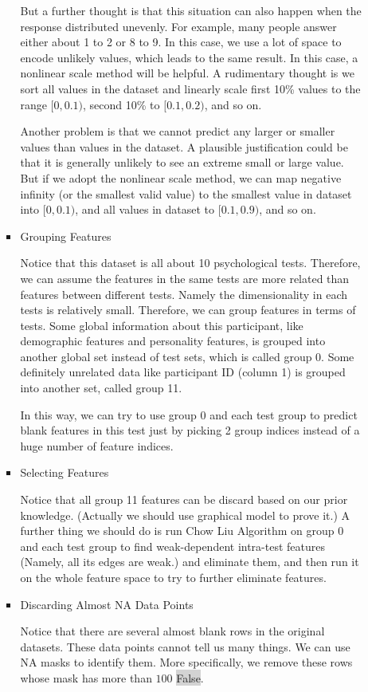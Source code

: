 \documentclass[11pt, a4paper]{article}
\begin{document}
\begin{enumerate}
\begin{itemize}
\begin{itemize}
			\par{But a further thought is that this situation can also happen when the response distributed unevenly. For example, many people answer either about 1 to 2 or 8 to 9. In this case, we use a lot of space to encode unlikely values, which leads to the same result. In this case, a nonlinear scale method will be helpful. A rudimentary thought is we sort all values in the dataset and linearly scale first 10\% values to the range $[0, 0.1)$, second 10\% to $[0.1, 0.2)$, and so on.}
			\par{Another problem is that we cannot predict any larger or smaller values than values in the dataset. A plausible justification could be that it is generally unlikely to see an extreme small or large value. But if we adopt the nonlinear scale method, we can map negative infinity (or the smallest valid value) to the smallest value in dataset into $[0, 0.1)$, and all values in dataset to $[0.1, 0.9)$, and so on.}
			\item {Grouping Features}
			\par{Notice that this dataset is all about 10 psychological tests. Therefore, we can assume the features in the same tests are more related than features between different tests. Namely the dimensionality in each tests is relatively small. Therefore, we can group features in terms of tests. Some global information about this participant, like demographic features and personality features, is grouped into another global set instead of test sets, which is called group 0. Some definitely unrelated data like participant ID (column 1) is grouped into another set, called group 11.}
			\par{In this way, we can try to use group 0 and each test group to predict blank features in this test just by picking 2 group indices instead of a huge number of feature indices.}
			\item {Selecting Features}
			\par{Notice that all group 11 features can be discard based on our prior knowledge. (Actually we should use graphical model to prove it.) A further thing we should do is run Chow Liu Algorithm on group 0 and each test group to find weak-dependent intra-test features (Namely, all its edges are weak.) and eliminate them, and then run it on the whole feature space to try to further eliminate features.}
			\item {Discarding Almost NA Data Points}
			\par{Notice that there are several almost blank rows in the original datasets. These data points cannot tell us many things. We can use NA masks to identify them. More specifically, we remove these rows whose mask has more than $100$ \colorbox{lightgray}{False}.}
		\end{itemize}
	\end{itemize}
	

\end{enumerate}
\end{document}

